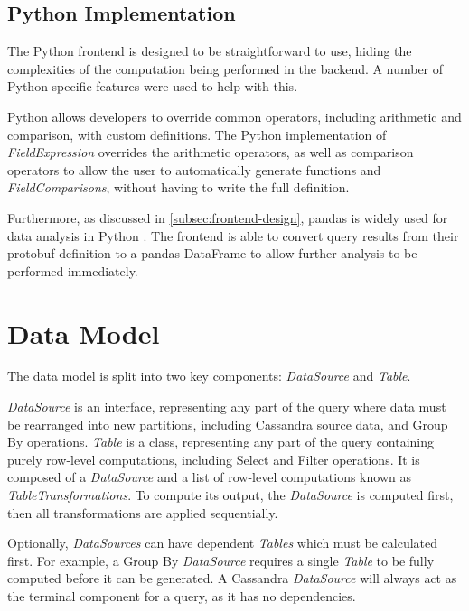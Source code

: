 \subsection{Python Implementation}\label{subsec:dsl-python}
The Python frontend is designed to be straightforward to use, hiding the complexities of the computation being performed in the backend. A number of Python-specific features were used to help with this.

Python allows developers to override common operators, including arithmetic and comparison, with custom definitions. The Python implementation of \textit{FieldExpression} overrides the arithmetic operators, as well as comparison operators to allow the user to automatically generate functions and \textit{FieldComparisons}, without having to write the full definition.

Furthermore, as discussed in \ref{subsec:frontend-design}, pandas is widely used for data analysis in Python \cite{reback2020pandas}. The frontend is able to convert query results from their protobuf definition to a pandas DataFrame to allow further analysis to be performed immediately.



\section{Data Model}\label{subsec:data-model}
The data model is split into two key components: \textit{DataSource} and \textit{Table}. 

\textit{DataSource} is an interface, representing any part of the query where data must be rearranged into new partitions, including Cassandra source data, and Group By operations. \textit{Table} is a class, representing any part of the query containing purely row-level computations, including Select and Filter operations. It is composed of a \textit{DataSource} and a list of row-level computations known as \textit{TableTransformations}. To compute its output, the \textit{DataSource} is computed first, then all transformations are applied sequentially.

Optionally, \textit{DataSources} can have dependent \textit{Tables} which must be calculated first. For example, a Group By \textit{DataSource} requires a single \textit{Table} to be fully computed before it can be generated. A Cassandra \textit{DataSource} will always act as the terminal component for a query, as it has no dependencies.

